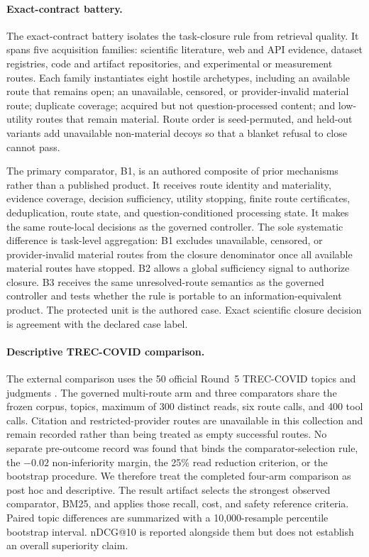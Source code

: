 \paragraph{Exact-contract battery.}
The exact-contract battery isolates the task-closure rule from retrieval
quality. It spans five acquisition families: scientific literature, web and API
evidence, dataset registries, code and artifact repositories, and experimental
or measurement routes. Each family instantiates eight hostile archetypes,
including an available route that remains open; an unavailable, censored, or
provider-invalid material route; duplicate coverage; acquired but not
question-processed content; and low-utility routes that remain material. Route
order is seed-permuted, and held-out variants add unavailable non-material
decoys so that a blanket refusal to close cannot pass.

The primary comparator, B1, is an authored composite of prior mechanisms rather
than a published product. It receives route identity and materiality, evidence
coverage, decision sufficiency, utility stopping, finite route certificates,
deduplication, route state, and question-conditioned processing state. It makes
the same route-local decisions as the governed controller. The sole systematic
difference is task-level aggregation: B1 excludes unavailable, censored, or
provider-invalid material routes from the closure denominator once all
available material routes have stopped. B2 allows a global sufficiency signal
to authorize closure. B3 receives the same unresolved-route semantics as the
governed controller and tests whether the rule is portable to an
information-equivalent product. The protected unit is the authored case. Exact
scientific closure decision is agreement with the declared case label.

\paragraph{Descriptive TREC-COVID comparison.}
The external comparison uses the 50 official Round~5 TREC-COVID topics and
judgments \cite{voorhees2020treccovid}. The governed multi-route arm and three
comparators share the frozen corpus, topics, maximum of 300 distinct reads, six
route calls, and 400 tool calls. Citation and restricted-provider routes are
unavailable in this collection and remain recorded rather than being treated as
empty successful routes. No separate pre-outcome record was found that binds the
comparator-selection rule, the $-0.02$ non-inferiority margin, the 25\% read
reduction criterion, or the bootstrap procedure. We therefore treat the
completed four-arm comparison as post hoc and descriptive. The result artifact
selects the strongest observed comparator, BM25, and applies those recall, cost,
and safety reference criteria. Paired topic differences are summarized with a
10,000-resample percentile bootstrap interval. nDCG@10 is reported alongside
them but does not establish an overall superiority claim.

